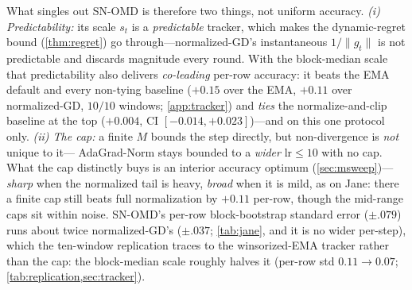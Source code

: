 \documentclass{article}
\newcommand{\norm}[1]{\lVert #1 \rVert}
\newcommand{\gt}{g_t}
\begin{document}
What singles out SN-OMD is therefore two things, not uniform accuracy. \emph{(i) Predictability:} its scale $s_t$ is a
\emph{predictable} tracker, which makes the dynamic-regret bound (\cref{thm:regret}) go
through---normalized-GD's instantaneous $1/\norm{\gt}$ is not predictable and discards
magnitude every round. With the block-median scale that predictability also delivers
\emph{co-leading} per-row accuracy: it beats the EMA default and every non-tying baseline
($+0.15$ over the EMA, $+0.11$ over normalized-GD, $10/10$ windows; \cref{app:tracker}) and
\emph{ties} the normalize-and-clip baseline at the top ($+0.004$, CI
$[-0.014,+0.023]$)---and on this one protocol only. \emph{(ii) The cap:} a
finite $M$ bounds the step directly, but non-divergence is \emph{not} unique to it---
AdaGrad-Norm stays bounded to a \emph{wider} $\mathrm{lr}\le10$ with no cap. What the cap
distinctly buys is an interior accuracy optimum (\cref{sec:msweep})---\emph{sharp} when the
normalized tail is heavy, \emph{broad} when it is mild, as on Jane: there a finite cap still
beats full normalization by ${+}0.11$ per-row, though the mid-range caps sit within noise. SN-OMD's per-row block-bootstrap standard
error ($\pm.079$) runs about twice normalized-GD's ($\pm.037$; \cref{tab:jane}, and it is no
wider per-step), which the ten-window replication traces to the winsorized-EMA tracker rather
than the cap: the block-median scale roughly halves it (per-row std $0.11\!\to\!0.07$;
\cref{tab:replication,sec:tracker}).
\end{document}
